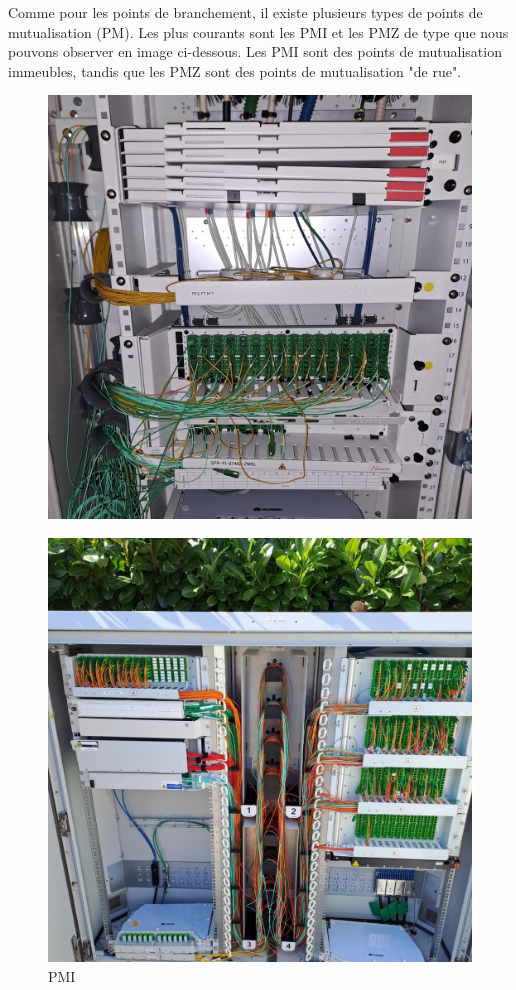 \documentclass[12pt, a4paper]{article}
\begin{document}
Comme pour les points de branchement, il existe plusieurs 
types de points de mutualisation (PM). Les plus courants 
sont les PMI et les PMZ de type que nous pouvons 
observer en image ci-dessous. Les PMI sont des points de mutualisation
immeubles, tandis que les PMZ sont des points de mutualisation
"de rue".\\
\begin{figure}[htbp]
    \centering
    \begin{minipage}[b]{0.4\textwidth}
		{\includegraphics[width=\textwidth]{img/pmi.jpg}}
      \caption{PMI}
    \end{minipage}
    \hspace{0.5cm} %
    \begin{minipage}[b]{0.4\textwidth}
      \includegraphics[width=\textwidth]{img/pmz.jpg}

\end{minipage}
\end{figure}
\end{document}
